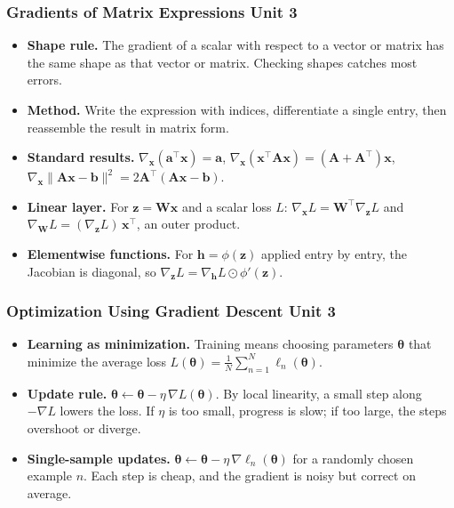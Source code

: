 \documentclass[12pt]{beamer}
\newcommand{\FrameTitle}[2]{\frametitle{#1 \hfill \small\textnormal{\textcolor{midgray}{#2}}}}
\begin{document}
\begin{frame}\FrameTitle{Gradients of Matrix Expressions}{Unit 3}
    \begin{itemize}
        \item \textbf{Shape rule.} The gradient of a scalar with respect to a
              vector or matrix has the same shape as that vector or matrix.
              Checking shapes catches most errors.
        \item \textbf{Method.} Write the expression with indices, differentiate
              a single entry, then reassemble the result in matrix form.
        \item \textbf{Standard results.}
              $\nabla_{\symbf{x}}(\symbf{a}^\top\symbf{x}) = \symbf{a}$, \;
              $\nabla_{\symbf{x}}(\symbf{x}^\top\symbf{A}\symbf{x})
                = (\symbf{A}+\symbf{A}^\top)\symbf{x}$, \;
              $\nabla_{\symbf{x}}\lVert\symbf{A}\symbf{x}-\symbf{b}\rVert^2
                = 2\symbf{A}^\top(\symbf{A}\symbf{x}-\symbf{b})$.
        \item \textbf{Linear layer.} For $\symbf{z} = \symbf{W}\symbf{x}$ and a
              scalar loss $L$:
              $\nabla_{\symbf{x}} L = \symbf{W}^\top \nabla_{\symbf{z}} L$ and
              $\nabla_{\symbf{W}} L = (\nabla_{\symbf{z}} L)\,\symbf{x}^\top$,
              an outer product.
        \item \textbf{Elementwise functions.} For
              $\symbf{h} = \phi(\symbf{z})$ applied entry by entry, the
              Jacobian is diagonal, so
              $\nabla_{\symbf{z}} L = \nabla_{\symbf{h}} L \odot \phi'(\symbf{z})$.
    \end{itemize}
\end{frame}


\begin{frame}\FrameTitle{Optimization Using Gradient Descent}{Unit 3}
    \begin{itemize}
        \item \textbf{Learning as minimization.} Training means choosing
              parameters $\symbf{\theta}$ that minimize the average loss
              $L(\symbf{\theta}) = \frac{1}{N}\sum_{n=1}^{N} \ell_n(\symbf{\theta})$.
        \item \textbf{Update rule.}
              $\symbf{\theta} \leftarrow \symbf{\theta} - \eta\,\nabla L(\symbf{\theta})$.
              By local linearity, a small step along $-\nabla L$ lowers the
              loss. If $\eta$ is too small, progress is slow; if too large,
              the steps overshoot or diverge.
        \item \textbf{Single-sample updates.}
              $\symbf{\theta} \leftarrow \symbf{\theta} - \eta\,\nabla \ell_n(\symbf{\theta})$
              for a randomly chosen example $n$. Each step is cheap, and the
              gradient is noisy but correct on average.
    \end{itemize}
\end{frame}
\end{document}
